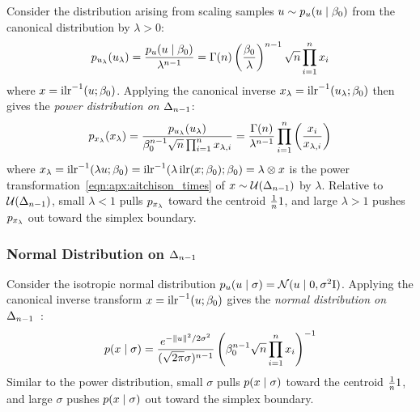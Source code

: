 Consider the distribution arising from scaling samples $u \sim p_{u}(u \mid \beta_{0})$ from the canonical distribution by $\lambda > 0$:
\begin{align}\label{eqn:apx:ilr_power_prior}
    p_{u_\lambda}(u_\lambda) = \frac{p_{u}(u \mid \beta_{0})}{\lambda^{n-1}} = \Gamma(n) \left(\frac{\beta_{0}}{\lambda}\right)^{n-1} \sqrt{n} \prod_{i=1}^{n} x_{i}
\end{align}
where $\vv{x} = \InvILR{\vv{u}; \beta_{0}}$.
Applying the canonical inverse $\vv{x}_{\lambda} = \InvILR{\vv{u}_{\lambda}; \beta_{0}}$ then gives the \textit{power distribution on $\Delta_{n-1}$}:
\begin{align}\label{eqn:apx:simplex_power_prior}
    p_{x_\lambda}(x_\lambda) = \frac{p_{u_\lambda}(u_\lambda)}{\beta_{0}^{n-1} \sqrt{n} \prod_{i=1}^{n} x_{\lambda,i}} = \frac{\Gamma(n)}{\lambda^{n-1}} \prod_{i=1}^{n} \left( \frac{x_{i}}{x_{\lambda,i}} \right)
\end{align}
where $\vv{x}_{\lambda} = \InvILR{\lambda \vv{u}; \beta_{0}} = \InvILR{\lambda \ILR{\vv{x}; \beta_{0}}; \beta_{0}} = \lambda \otimes \vv{x}$ is the power transformation~\eqref{eqn:apx:aitchison_times} of $x \sim \mathcal{U}(\Delta_{n-1})$ by $\lambda$.
Relative to $\mathcal{U}(\Delta_{n-1})$, small $\lambda < 1$ pulls $p_{x_\lambda}$ toward the centroid $\frac{1}{n} \mathrm{1}$, and large $\lambda > 1$ pushes $p_{x_\lambda}$ out toward the simplex boundary.

\subsubsection{Normal Distribution on \texorpdfstring{$\Delta_{n-1}$}{DeltaNMinusOne}}

Consider the isotropic normal distribution $p_{u}(u \mid \sigma) = \mathcal{N}(u \mid \mathrm{0}, \sigma^2 \mathrm{I})$.
Applying the canonical inverse transform $\vv{x} = \InvILR{\vv{u}; \beta_{0}}$ gives the \textit{normal distribution on $\Delta_{n-1}$}~\citep{figueras_distributions_2003}:
\begin{align}\label{eqn:apx:simplex_normal_prior}
    p(x \mid \sigma)
    = \frac{e^{-\lVert u \rVert^2 / 2\sigma^2}}{ ( \sqrt{2\pi} \sigma )^{n-1} }
    \left( \beta_{0}^{n-1} \sqrt{n} \prod_{i=1}^{n} x_{i} \right)^{-1}
\end{align}
Similar to the power distribution, small $\sigma$ pulls $p(x \mid \sigma)$ toward the centroid $\frac{1}{n} \mathrm{1}$, and large $\sigma$ pushes $p(x \mid \sigma)$ out toward the simplex boundary.

